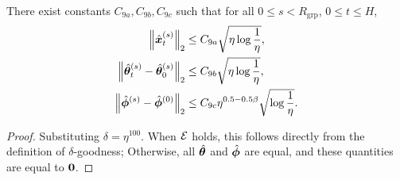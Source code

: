 
\begin{corollary}\label{concentration-after-convergence}
    There exist constants $C_{9a}, C_{9b}, C_{9c}$ such that for all $0 \leq s < R_{\mathrm{grp}}$, $0 \leq t \leq H$, \begin{align*}
        \left\|\hat{{\bm{x}}}_{t}^{(s)}\right\|_2 & \leq C_{9a} \sqrt{\eta \log \frac{1}{\eta}}, \\
        \left\|\hat{{\bm{\theta}}}_{t}^{(s)} - \hat{{\bm{\theta}}}_0^{(s)}\right\|_2 & \leq C_{9b} \sqrt{\eta \log \frac{1}{\eta}}, \\
        \left\|\hat{{\bm{\phi}}}^{(s)}-\hat{{\bm{\phi}}}^{(0)}\right\|_2 & \leq C_{9c}\eta^{0.5-0.5\beta}\sqrt{\log \frac{1}{\eta}}.
    \end{align*}
\end{corollary}
\begin{proof}
    Substituting $\delta = \eta^{100}$. When $\mathcal{E}$ holds, this follows directly from the definition of $\delta$-goodness; Otherwise, all $\hat{{\bm{\theta}}}$ and $\hat{{\bm{\phi}}}$ are equal, and these quantities are equal to $\bf{0}$.
\end{proof}

